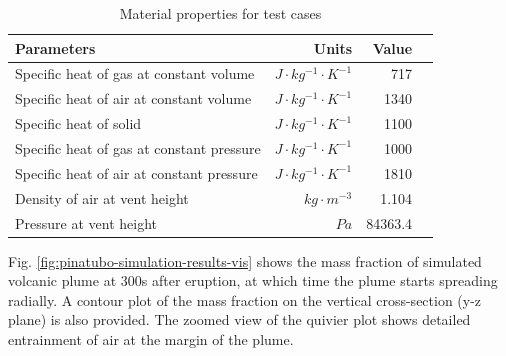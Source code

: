 \begin{table}[htp]
\centering
	\begin{centering}
      \caption{Material properties for test cases}		
	  \begin{tabular}{lrrr}
	    \hline
	    Parameters & Units  & Value \\
	    \hline
	    	Specific heat of gas at constant volume     & $J \cdot kg^{-1}\cdot K^{-1}$& 717     \\
	    Specific heat of air at constant volume     & $J \cdot kg^{-1}\cdot K^{-1}$& 1340    \\
	    	Specific heat of solid                      & $J \cdot kg^{-1}\cdot K^{-1}$& 1100    \\
	    	Specific heat of gas at constant pressure   & $J \cdot kg^{-1}\cdot K^{-1}$& 1000    \\
	    	Specific heat of air at constant pressure   & $J \cdot kg^{-1}\cdot K^{-1}$& 1810    \\
	    	Density of air at vent height               & $kg \cdot m^{-3}$       & 1.104   \\
	    Pressure at vent height                        & $Pa$              & 84363.4 \\
	    \hline
	  \end{tabular}
	  \label{tab:material_properties}
	\end{centering}
\end{table}

Fig. \ref{fig:pinatubo-simulation-results-vis} shows the mass fraction of simulated volcanic plume at 300s after eruption, at which time the plume starts spreading radially. A contour plot of the mass fraction on the vertical cross-section (y-z plane) is also provided. The zoomed view of the quivier plot shows detailed entrainment of air at the margin of the plume.

